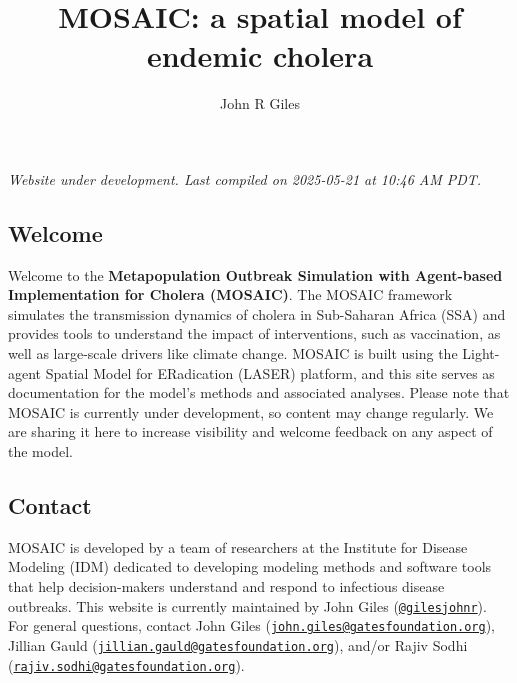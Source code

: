 \documentclass[
]{book}
\title{MOSAIC: a spatial model of endemic cholera}
\author{John R Giles}
\date{}
\begin{document}
\maketitle

{
\setcounter{tocdepth}{1}
\tableofcontents
}
\chapter*{}\label{section}

\hfill\break

{\emph{
Website under development. Last compiled on 2025-05-21 at 10:46 AM PDT.
}}

\section*{Welcome}\label{welcome}

Welcome to the \textbf{Metapopulation Outbreak Simulation with Agent-based Implementation for Cholera (MOSAIC)}. The MOSAIC framework simulates the transmission dynamics of cholera in Sub-Saharan Africa (SSA) and provides tools to understand the impact of interventions, such as vaccination, as well as large-scale drivers like climate change. MOSAIC is built using the Light-agent Spatial Model for ERadication (LASER) platform, and this site serves as documentation for the model's methods and associated analyses. Please note that MOSAIC is currently under development, so content may change regularly. We are sharing it here to increase visibility and welcome feedback on any aspect of the model.

\section*{Contact}\label{contact}

MOSAIC is developed by a team of researchers at the Institute for Disease Modeling (IDM) dedicated to developing modeling methods and software tools that help decision-makers understand and respond to infectious disease outbreaks. This website is currently maintained by John Giles (\href{https://github.com/gilesjohnr}{\texttt{@gilesjohnr}}). For general questions, contact John Giles (\href{mailto:john.giles@gatesfoundation.org}{\nolinkurl{john.giles@gatesfoundation.org}}), Jillian Gauld (\href{mailto:jillian.gauld@gatesfoundation.org}{\nolinkurl{jillian.gauld@gatesfoundation.org}}), and/or Rajiv Sodhi (\href{mailto:rajiv.sodhi@gatesfoundation.org}{\nolinkurl{rajiv.sodhi@gatesfoundation.org}}).
\end{document}
